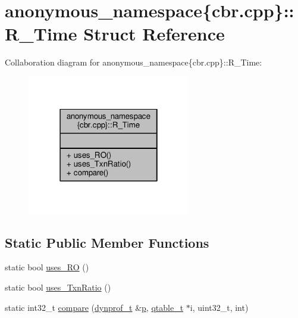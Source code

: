 \hypertarget{structanonymous__namespace_02cbr_8cpp_03_1_1R__Time}{\section{anonymous\-\_\-namespace\{cbr.\-cpp\}\-:\-:R\-\_\-\-Time Struct Reference}
\label{structanonymous__namespace_02cbr_8cpp_03_1_1R__Time}
}


Collaboration diagram for anonymous\-\_\-namespace\{cbr.\-cpp\}\-:\-:R\-\_\-\-Time\-:
\nopagebreak
\begin{figure}[H]
\begin{center}
\leavevmode
\includegraphics[width=202pt]{structanonymous__namespace_02cbr_8cpp_03_1_1R__Time__coll__graph}
\end{center}
\end{figure}
\subsection*{Static Public Member Functions}
\begin{DoxyCompactItemize}
\item 
static bool \hyperlink{structanonymous__namespace_02cbr_8cpp_03_1_1R__Time_ae3db51be194b150e6fe9ef711a7f6ca1}{uses\-\_\-\-R\-O} ()
\item 
static bool \hyperlink{structanonymous__namespace_02cbr_8cpp_03_1_1R__Time_a1dd1e14aebba7ac5f0b0fc2cb6ad0a46}{uses\-\_\-\-Txn\-Ratio} ()
\item 
static int32\-\_\-t \hyperlink{structanonymous__namespace_02cbr_8cpp_03_1_1R__Time_a836226461b57079f4be3da565a2d5560}{compare} (\hyperlink{structstm_1_1dynprof__t}{dynprof\-\_\-t} \&\hyperlink{counted__ptr_8hpp_a5c9f59d7c24e3fd6ceae319a968fc3e0}{p}, \hyperlink{structstm_1_1qtable__t}{qtable\-\_\-t} $\ast$i, uint32\-\_\-t, int)
\end{DoxyCompactItemize}


